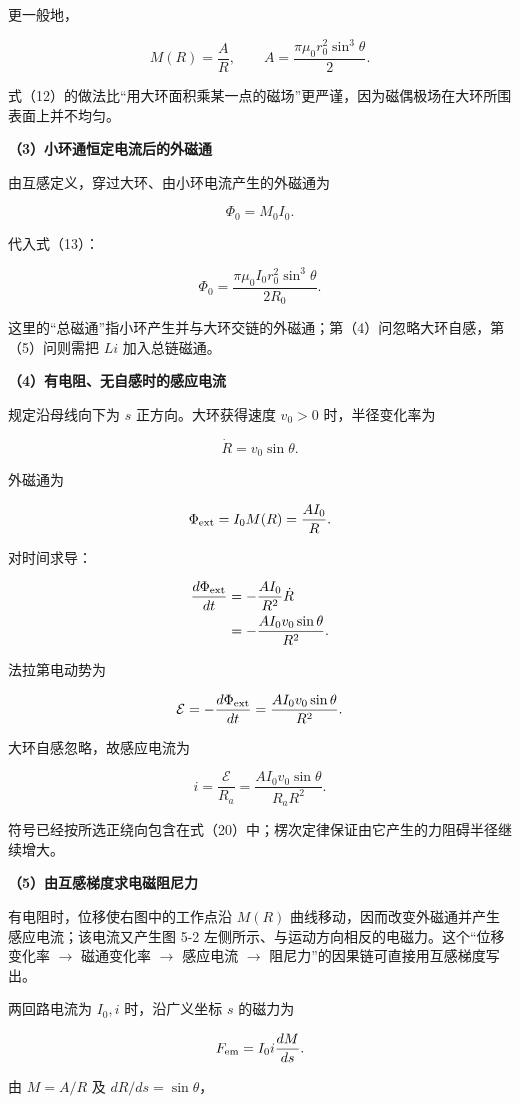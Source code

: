 \documentclass[12pt,a4paper,UTF8]{ctexart}
\begin{document}
更一般地，

\[\boxed{M(R)=\frac AR},\qquad
A=\frac{\pi\mu_0r_0^2\sin^3\theta}{2}.\]

式（12）的做法比``用大环面积乘某一点的磁场''更严谨，因为磁偶极场在大环所围表面上并不均匀。

\textbf{（3）小环通恒定电流后的外磁通}

由互感定义，穿过大环、由小环电流产生的外磁通为

\[\Phi_0=M_0I_0.\]

代入式（13）：

\[\boxed{\Phi_0=
\frac{\pi\mu_0I_0r_0^2\sin^3\theta}{2R_0}}.\]

这里的``总磁通''指小环产生并与大环交链的外磁通；第（4）问忽略大环自感，第（5）问则需把
\(Li\) 加入总链磁通。

\textbf{（4）有电阻、无自感时的感应电流}

规定沿母线向下为 \(s\) 正方向。大环获得速度 \(v_0>0\) 时，半径变化率为

\[\dot R=v_0\sin\theta.\]

外磁通为

\[\Phi_{\rm ext}=I_0M(R)=\frac{AI_0}{R}.\]

对时间求导：

\[\begin{aligned}
\frac{d\Phi_{\rm ext}}{dt}
&=-\frac{AI_0}{R^2}\dot R\\
&=-\frac{AI_0v_0\sin\theta}{R^2}.
\end{aligned}\]

法拉第电动势为

\[\mathcal E=-\frac{d\Phi_{\rm ext}}{dt}
=\frac{AI_0v_0\sin\theta}{R^2}.\]

大环自感忽略，故感应电流为

\[i=\frac{\mathcal E}{R_a}
=\frac{AI_0v_0\sin\theta}{R_aR^2}.\]

符号已经按所选正绕向包含在式（20）中；楞次定律保证由它产生的力阻碍半径继续增大。

\textbf{（5）由互感梯度求电磁阻尼力}

有电阻时，位移使右图中的工作点沿 \(M(R)\)
曲线移动，因而改变外磁通并产生感应电流；该电流又产生图 5-2
左侧所示、与运动方向相反的电磁力。这个``位移变化率 \(\to\) 磁通变化率
\(\to\) 感应电流 \(\to\) 阻尼力''的因果链可直接用互感梯度写出。

两回路电流为 \(I_0,i\) 时，沿广义坐标 \(s\) 的磁力为

\[F_{\rm em}=I_0i\frac{dM}{ds}.\]

由 \(M=A/R\) 及 \(dR/ds=\sin\theta\)，
\end{document}
